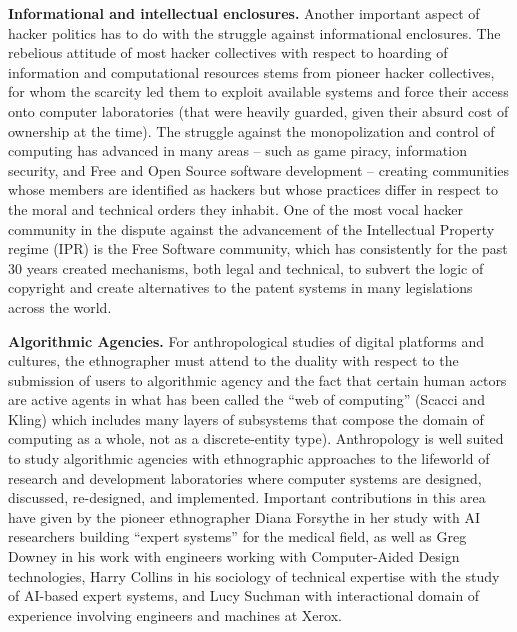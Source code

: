 \documentclass[10pt,letter,oneside]{scrartcl}
\begin{document}


{\bf Informational and intellectual enclosures.} Another important aspect of hacker politics
has to do with the struggle against informational enclosures. The rebelious attitude of most
hacker collectives with respect to hoarding of information and computational resources stems
from pioneer hacker collectives, for whom the scarcity led them to exploit available systems
and force their access onto computer laboratories (that were heavily guarded, given their
absurd cost of ownership at the time). The struggle against the monopolization and control of 
computing has advanced in many areas -- such as game piracy, information security, and 
Free and Open Source software development -- creating communities whose members are 
identified as hackers but whose practices differ in respect to the moral and technical 
orders they inhabit. One of the most vocal hacker community in the dispute against the 
advancement of the Intellectual Property regime (IPR) is the Free Software community, which 
has consistently for the past 30 years created mechanisms, both legal and technical, to subvert 
the logic of copyright and create alternatives to the patent systems in many legislations
across the world.


{\bf Algorithmic Agencies.} For anthropological studies of digital platforms and cultures,
the ethnographer must attend to the duality with respect to the submission of users to
algorithmic agency and the fact that certain human actors are active agents in what has
been called the ``web of computing'' (Scacci and Kling) which includes many layers of 
subsystems that compose the domain of computing as a whole, not as a discrete-entity type). 
Anthropology is well suited to study algorithmic agencies with ethnographic approaches to 
the lifeworld of research and development laboratories where computer systems are 
designed, discussed, re-designed, and implemented. Important contributions
in this area have given by the pioneer ethnographer Diana Forsythe in her study with AI 
researchers building ``expert systems'' for the medical field, as well as Greg Downey in his
work with engineers working with Computer-Aided Design technologies, Harry Collins in his
sociology of technical expertise with the study of AI-based expert systems, and Lucy 
Suchman with interactional domain of experience involving engineers and machines at Xerox. 
\end{document}
